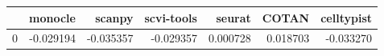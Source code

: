 \begin{tabular}{lrrrrrr}
\toprule
 & monocle & scanpy & scvi-tools & seurat & COTAN & celltypist \\
\midrule
0 & -0.029194 & -0.035357 & -0.029357 & 0.000728 & 0.018703 & -0.033270 \\
\bottomrule
\end{tabular}
